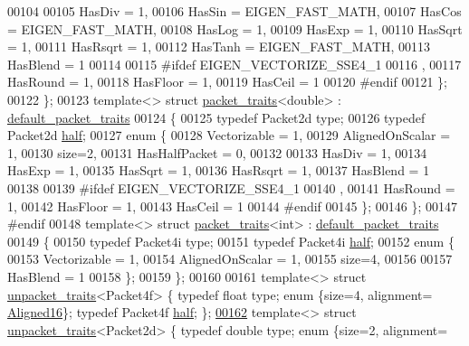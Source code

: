\begin{DoxyCode}
00104 
00105     HasDiv  = 1,
00106     HasSin  = EIGEN\_FAST\_MATH,
00107     HasCos  = EIGEN\_FAST\_MATH,
00108     HasLog  = 1,
00109     HasExp  = 1,
00110     HasSqrt = 1,
00111     HasRsqrt = 1,
00112     HasTanh  = EIGEN\_FAST\_MATH,
00113     HasBlend = 1
00114 
00115 \textcolor{preprocessor}{#ifdef EIGEN\_VECTORIZE\_SSE4\_1}
00116     ,
00117     HasRound = 1,
00118     HasFloor = 1,
00119     HasCeil = 1
00120 \textcolor{preprocessor}{#endif}
00121   \};
00122 \};
00123 \textcolor{keyword}{template}<> \textcolor{keyword}{struct }\hyperlink{struct_eigen_1_1internal_1_1packet__traits}{packet\_traits}<double> : \hyperlink{struct_eigen_1_1internal_1_1default__packet__traits}{default\_packet\_traits}
00124 \{
00125   \textcolor{keyword}{typedef} Packet2d type;
00126   \textcolor{keyword}{typedef} Packet2d \hyperlink{struct_eigen_1_1half}{half};
00127   \textcolor{keyword}{enum} \{
00128     Vectorizable = 1,
00129     AlignedOnScalar = 1,
00130     size=2,
00131     HasHalfPacket = 0,
00132 
00133     HasDiv  = 1,
00134     HasExp  = 1,
00135     HasSqrt = 1,
00136     HasRsqrt = 1,
00137     HasBlend = 1
00138 
00139 \textcolor{preprocessor}{#ifdef EIGEN\_VECTORIZE\_SSE4\_1}
00140     ,
00141     HasRound = 1,
00142     HasFloor = 1,
00143     HasCeil = 1
00144 \textcolor{preprocessor}{#endif}
00145   \};
00146 \};
00147 \textcolor{preprocessor}{#endif}
00148 \textcolor{keyword}{template}<> \textcolor{keyword}{struct }\hyperlink{struct_eigen_1_1internal_1_1packet__traits}{packet\_traits}<int>    : \hyperlink{struct_eigen_1_1internal_1_1default__packet__traits}{default\_packet\_traits}
00149 \{
00150   \textcolor{keyword}{typedef} Packet4i type;
00151   \textcolor{keyword}{typedef} Packet4i \hyperlink{struct_eigen_1_1half}{half};
00152   \textcolor{keyword}{enum} \{
00153     Vectorizable = 1,
00154     AlignedOnScalar = 1,
00155     size=4,
00156 
00157     HasBlend = 1
00158   \};
00159 \};
00160 
00161 \textcolor{keyword}{template}<> \textcolor{keyword}{struct }\hyperlink{struct_eigen_1_1internal_1_1unpacket__traits}{unpacket\_traits}<Packet4f> \{ \textcolor{keyword}{typedef} \textcolor{keywordtype}{float}  type; \textcolor{keyword}{enum} \{size=4, alignment=
      \hyperlink{group__enums_gga45fe06e29902b7a2773de05ba27b47a1af8e2bf74b04c02199f62c5e3c06dbfcc}{Aligned16}\}; \textcolor{keyword}{typedef} Packet4f \hyperlink{struct_eigen_1_1half}{half}; \};
\hyperlink{struct_eigen_1_1internal_1_1unpacket__traits_3_01_packet2d_01_4}{00162} \textcolor{keyword}{template}<> \textcolor{keyword}{struct }\hyperlink{struct_eigen_1_1internal_1_1unpacket__traits}{unpacket\_traits}<Packet2d> \{ \textcolor{keyword}{typedef} \textcolor{keywordtype}{double} type; \textcolor{keyword}{enum} \{size=2, alignment=

\end{DoxyCode}
